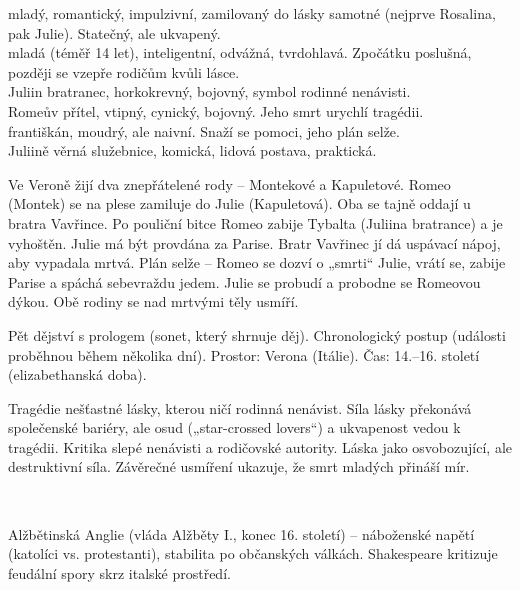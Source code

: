 \documentclass[FGBook.tex]{subfiles}
\begin{document}
\noindent 
{} mladý, romantický, impulzivní, zamilovaný do lásky samotné (nejprve Rosalina, pak Julie). Statečný, ale ukvapený.\\
 mladá (téměř 14 let), inteligentní, odvážná, tvrdohlavá. Zpočátku poslušná, později se vzepře rodičům kvůli lásce.\\
 Juliin bratranec, horkokrevný, bojovný, symbol rodinné nenávisti.\\
 Romeův přítel, vtipný, cynický, bojovný. Jeho smrt urychlí tragédii.\\
 františkán, moudrý, ale naivní. Snaží se pomoci, jeho plán selže.\\
 Juliině věrná služebnice, komická, lidová postava, praktická.

\noindent Ve Veroně žijí dva znepřátelené rody – Montekové a Kapuletové. Romeo (Montek) se na plese zamiluje do Julie (Kapuletová). Oba se tajně oddají u bratra Vavřince. Po pouliční bitce Romeo zabije Tybalta (Juliina bratrance) a je vyhoštěn. Julie má být provdána za Parise. Bratr Vavřinec jí dá uspávací nápoj, aby vypadala mrtvá. Plán selže – Romeo se dozví o „smrti“ Julie, vrátí se, zabije Parise a spáchá sebevraždu jedem. Julie se probudí a probodne se Romeovou dýkou. Obě rodiny se nad mrtvými těly usmíří.

\noindent Pět dějství s prologem (sonet, který shrnuje děj). Chronologický postup (události proběhnou během několika dní). Prostor: Verona (Itálie). Čas: 14.–16. století (elizabethanská doba).

\noindent Tragédie nešťastné lásky, kterou ničí rodinná nenávist. Síla lásky překonává společenské bariéry, ale osud („star-crossed lovers“) a ukvapenost vedou k tragédii. Kritika slepé nenávisti a rodičovské autority. Láska jako osvobozující, ale destruktivní síla. Závěrečné usmíření ukazuje, že smrt mladých přináší mír.

\vspace*{2em}\\

\noindent Alžbětinská Anglie (vláda Alžběty I., konec 16. století) – náboženské napětí (katolíci vs. protestanti), stabilita po občanských válkách. Shakespeare kritizuje feudální spory skrz italské prostředí.
\end{document}
